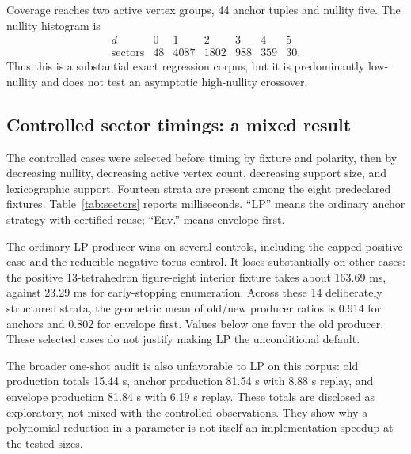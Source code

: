 Coverage reaches two active vertex groups, 44 anchor tuples and nullity five. The nullity histogram is
\[
\begin{array}{c|rrrrrr}
d&0&1&2&3&4&5\\\hline
\text{sectors}&48&4087&1802&988&359&30.
\end{array}
\]
Thus this is a substantial exact regression corpus, but it is predominantly low-nullity and does not test an asymptotic high-nullity crossover.

\subsection{Controlled sector timings: a mixed result}

The controlled cases were selected before timing by fixture and polarity, then by decreasing nullity, decreasing active vertex count, decreasing support size, and lexicographic support. Fourteen strata are present among the eight predeclared fixtures. Table~\ref{tab:sectors} reports milliseconds. ``LP'' means the ordinary anchor strategy with certified reuse; ``Env.'' means envelope first.

\begin{table}[htbp]
\centering\small

\caption{Complete sector producers and separate independent replay; medians of five repetitions, in milliseconds. Sign is canonical positive-Euler existence, not a knot verdict.}\label{tab:sectors}
\end{table}

The ordinary LP producer wins on several controls, including the capped positive case and the reducible negative torus control. It loses substantially on other cases: the positive 13-tetrahedron figure-eight interior fixture takes about 163.69 ms, against 23.29 ms for early-stopping enumeration. Across these 14 deliberately structured strata, the geometric mean of old/new producer ratios is 0.914 for anchors and 0.802 for envelope first. Values below one favor the old producer. These selected cases do not justify making LP the unconditional default.

The broader one-shot audit is also unfavorable to LP on this corpus: old production totals 15.44 s, anchor production 81.54 s with 8.88 s replay, and envelope production 81.84 s with 6.19 s replay. These totals are disclosed as exploratory, not mixed with the controlled observations. They show why a polynomial reduction in a parameter is not itself an implementation speedup at the tested sizes.

